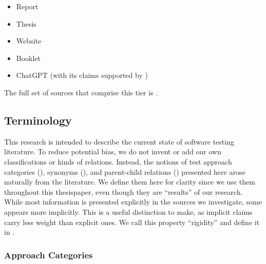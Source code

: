 \begin{itemize}
    \item Report \citep{Kam2008,Gerrard2000a,Gerrard2000b}
    \item Thesis \citep{Bas2024}
    \item Website \citep{LambdaTest2024,Pandey2023}
    \item Booklet \citep{SPICE2022}
    \item \ifnotpaper \else ChatGPT \fi \citet{ChatGPT2024} (with its claims
          supported by \citet{RusEtAl2008})
\end{itemize}

The full set of sources that comprise this tier is .

\ifnotpaper\else
    \begin{table*}[t!]
        \ieeeCatsTable{}
    \end{table*}
\fi

\subsection{Terminology}

\def\rigidBlurb{While most information is presented explicitly in the sources
    we investigate, some appears more implicitly. This is a useful distinction
    to make, as implicit claims carry less weight than explicit ones. We call
    this property ``rigidity''}

This research is intended to describe the current state of software testing
literature. To reduce potential bias, we do not invent or add our own
classifications or kinds of relations. Instead, the notions of test approach
categories (), synonyms (), and
parent-child relations () presented here
arose\ptq{} naturally from the literature. We define them here for clarity
since we use them throughout this \ifnotpaper thesis\else paper\fi, even
though they are ``results'' of our research. \rigidBlurb{} and define it
in .

\subsubsection{Approach Categories}
\label{categories-observ}

